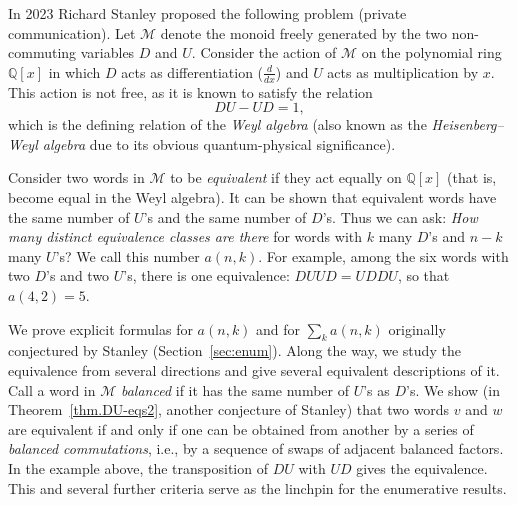 \documentclass[numbers=enddot,12pt,final,onecolumn,notitlepage]{scrartcl}%
\theoremstyle{definition}
\newcommand{\M}{\mathcal{M}}
\newcommand{\QQ}{\mathbb{Q}}
\newcommand{\ive}[1]{\left[ #1 \right]}
\begin{document}
In 2023 Richard Stanley proposed the following problem (private communication).  Let 
$\mathcal{M}$ denote the monoid freely generated by the two non-commuting variables $D$ and $U$.
Consider the action of $\M$ on the polynomial ring $\QQ\ive{x}$ in which $D$ acts as differentiation ($\frac{d}{dx}$) and $U$ acts as multiplication by $x$.
This action is not free, as it is known to satisfy the relation
\begin{equation}\label{eq:Weyl}
DU-UD = 1 ,
\end{equation}
which is the defining relation of the \emph{Weyl algebra}
(also known as the \emph{Heisenberg--Weyl algebra} \cite{GoF09} due to its obvious quantum-physical significance).

Consider two words in $\M$ to be \emph{equivalent} if they act equally on $\QQ\ive{x}$ (that is, become equal in the Weyl algebra).
It can be shown that equivalent words have the same number of $U$'s and the same number of $D$'s.
Thus we can ask: \textit{How many distinct equivalence classes
are there} for words with $k$ many $D$'s and $n-k$ many $U$'s?
We call this number $a(n,k)$.  For example, among the six words with two $D$'s
and two $U$'s, there is one equivalence: $DUUD = UDDU$, so that $a(4,2)=5$.

We prove explicit formulas for $a(n,k)$ and for $\sum_k a(n,k)$ originally conjectured by Stanley (Section~\ref{sec:enum}).
Along the way, we study the equivalence from several directions and give several equivalent descriptions of it.
Call a word in $\M$ \textit{balanced} if it has the same number of $U$'s
as $D$'s.
We show (in Theorem~\ref{thm.DU-eqs2}, another conjecture of Stanley) that two words $v$ and $w$ are equivalent if and only if one can be obtained from
another by a series of \textit{balanced commutations}, i.e., by a sequence of swaps of
adjacent balanced factors.  In the example above, the transposition of $DU$ with $UD$ gives
the equivalence.
This and several further criteria serve as the linchpin for the enumerative results. 
\end{document}
